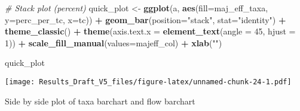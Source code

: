 \documentclass[
]{article}
\newenvironment{Shaded}{\begin{snugshade}}{\end{snugshade}}
\newcommand{\CommentTok}[1]{\textcolor[rgb]{0.56,0.35,0.01}{\textit{#1}}}
\newcommand{\DataTypeTok}[1]{\textcolor[rgb]{0.13,0.29,0.53}{#1}}
\newcommand{\DecValTok}[1]{\textcolor[rgb]{0.00,0.00,0.81}{#1}}
\newcommand{\KeywordTok}[1]{\textcolor[rgb]{0.13,0.29,0.53}{\textbf{#1}}}
\newcommand{\NormalTok}[1]{#1}
\newcommand{\OperatorTok}[1]{\textcolor[rgb]{0.81,0.36,0.00}{\textbf{#1}}}
\newcommand{\StringTok}[1]{\textcolor[rgb]{0.31,0.60,0.02}{#1}}
\begin{document}
\begin{Shaded}
\begin{Highlighting}[]
\CommentTok{# Stack plot (percent)}
\NormalTok{  quick_plot <-}\StringTok{ }\KeywordTok{ggplot}\NormalTok{(a, }\KeywordTok{aes}\NormalTok{(}\DataTypeTok{fill=}\NormalTok{maj_eff_taxa, }\DataTypeTok{y=}\NormalTok{perc_per_tc, }\DataTypeTok{x=}\NormalTok{tc)) }\OperatorTok{+}\StringTok{ }
\StringTok{                }\KeywordTok{geom_bar}\NormalTok{(}\DataTypeTok{position=}\StringTok{"stack"}\NormalTok{, }\DataTypeTok{stat=}\StringTok{"identity"}\NormalTok{) }\OperatorTok{+}
\StringTok{                }\KeywordTok{theme_classic}\NormalTok{() }\OperatorTok{+}
\StringTok{                }\KeywordTok{theme}\NormalTok{(}\DataTypeTok{axis.text.x =} \KeywordTok{element_text}\NormalTok{(}\DataTypeTok{angle =} \DecValTok{45}\NormalTok{, }\DataTypeTok{hjust =} \DecValTok{1}\NormalTok{)) }\OperatorTok{+}
\StringTok{                }\KeywordTok{scale_fill_manual}\NormalTok{(}\DataTypeTok{values=}\NormalTok{majeff_col) }\OperatorTok{+}
\StringTok{                }\KeywordTok{xlab}\NormalTok{(}\StringTok{""}\NormalTok{)}

\NormalTok{quick_plot}
\end{Highlighting}
\end{Shaded}

\texttt{[image: Results\_Draft\_V5\_files/figure-latex/unnamed-chunk-24-1.pdf]}

Side by side plot of taxa barchart and flow barchart
\end{document}
